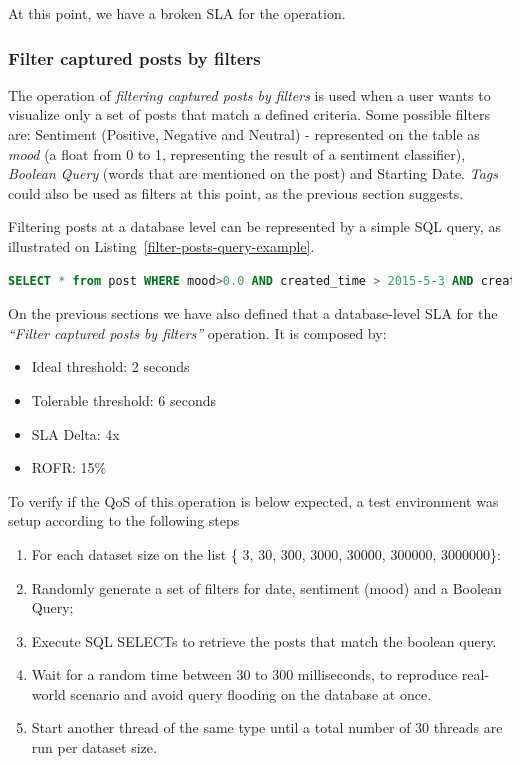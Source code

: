 At this point, we have a broken SLA for the operation.

\clearpage

\subsubsection{Filter captured posts by filters}
\label{filterposts}

The operation of \textit{filtering captured posts by filters} is used when a user wants to visualize only a set of posts that match a defined criteria. Some possible filters are: Sentiment (Positive, Negative and Neutral) - represented on the table as \textit{mood} (a float from 0 to 1, representing the result of a sentiment classifier), \textit{Boolean Query} (words that are mentioned on the post) and Starting Date. \textit{Tags} could also be used as filters at this point, as the previous section suggests. 

Filtering posts at a database level can be represented by a simple SQL query, as illustrated on Listing~\ref{filter-posts-query-example}.

\begin{lstlisting}[language=SQL,firstnumber=1, caption=Filter posts query - Example, label=filter-posts-query-example]
SELECT * from post WHERE mood>0.0 AND created_time > 2015-5-3 AND created_time < 2015-7-15 AND message like '%ruim%'
\end{lstlisting} 


On the previous sections we have also defined that a database-level SLA for the \textit{``Filter captured posts by filters''} operation. It is composed by: 

\begin{itemize}
	\item{Ideal threshold: 2 seconds}
	\item{Tolerable threshold: 6 seconds}
	\item{SLA Delta: 4x}
	\item{ROFR: 15\%}
\end{itemize}

To verify if the QoS of this operation is below expected, a test environment was setup according to the following steps

\begin{enumerate}
\item{For each dataset size on the list \{ 3, 30, 300, 3000, 30000, 300000, 3000000\}:}
\item{Randomly generate a set of filters for date, sentiment (mood) and a Boolean Query;}
\item{Execute SQL SELECTs to retrieve the posts that match the boolean query.}
\item{Wait for a random time between 30 to 300 milliseconds, to reproduce real-world scenario and avoid	query flooding on the database at once.}
\item{Start another thread of the same type until a total number of 30 threads are run per dataset size.}
\end{enumerate}



